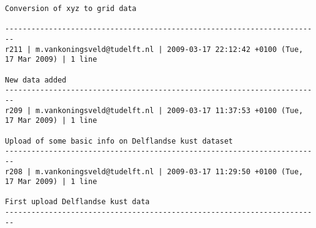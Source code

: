 \documentclass[9]{report}
\begin{document}
\begin{description}
\begin{verbatim}
Conversion of xyz to grid data

------------------------------------------------------------------------
r211 | m.vankoningsveld@tudelft.nl | 2009-03-17 22:12:42 +0100 (Tue, 17 Mar 2009) | 1 line

New data added
------------------------------------------------------------------------
r209 | m.vankoningsveld@tudelft.nl | 2009-03-17 11:37:53 +0100 (Tue, 17 Mar 2009) | 1 line

Upload of some basic info on Delflandse kust dataset
------------------------------------------------------------------------
r208 | m.vankoningsveld@tudelft.nl | 2009-03-17 11:29:50 +0100 (Tue, 17 Mar 2009) | 1 line

First upload Delflandse kust data
------------------------------------------------------------------------


\end{verbatim}
\end{description}
\end{document}
